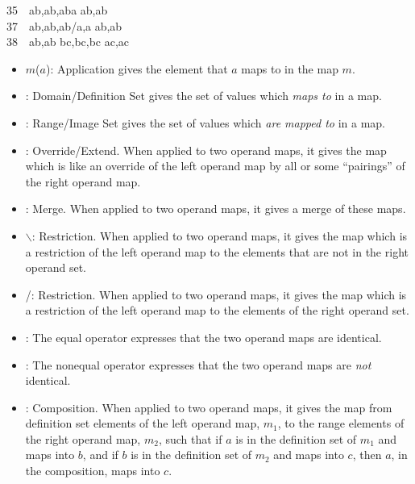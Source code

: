 {{\LBRACKET}35{\RBRACKET}\ \ {\LBRACKET}a{\MAPSTO}b,a{\PRIM}{\MAPSTO}b{\PRIM},a{\PRIM}{\PRIM}{\MAPSTO}b{\PRIM}{\PRIM}{\RBRACKET}{\SETMINUS}{\LBRACE}a{\RBRACE} {\EQ} {\LBRACKET}a{\PRIM}{\MAPSTO}b{\PRIM},a{\PRIM}{\PRIM}{\MAPSTO}b{\PRIM}{\PRIM}{\RBRACKET}\\
{\LBRACKET}37{\RBRACKET}\ \ {\LBRACKET}a{\MAPSTO}b,a{\PRIM}{\MAPSTO}b{\PRIM},a{\PRIM}{\PRIM}{\MAPSTO}b{\PRIM}{\PRIM}{\RBRACKET}/{\LBRACE}a{\PRIM},a{\PRIM}{\PRIM}{\RBRACE} {\EQ} {\LBRACKET}a{\PRIM}{\MAPSTO}b{\PRIM},a{\PRIM}{\PRIM}{\MAPSTO}b{\PRIM}{\PRIM}{\RBRACKET}\\
{\LBRACKET}38{\RBRACKET}\ \ {\LBRACKET}a{\MAPSTO}b,a{\PRIM}{\MAPSTO}b{\PRIM}{\RBRACKET} {\HASH} {\LBRACKET}b{\MAPSTO}c,b{\PRIM}{\MAPSTO}c{\PRIM},b{\PRIM}{\PRIM}{\MAPSTO}c{\PRIM}{\PRIM}{\RBRACKET} {\EQ} {\LBRACKET}a{\MAPSTO}c,a{\PRIM}{\MAPSTO}c{\PRIM}{\RBRACKET}
\ep
}


\begin{itemize}
\item{$m$($a$):} Application gives the element that $a$ maps to in
  the map $m$.
\item{:} Domain/Definition Set gives the set of values which
  \emph{maps to} in a map. 
\item{:} Range/Image Set gives the set of values which
  \emph{are mapped to} in a map.   
\item{\DAGGER:} Override/Extend. When applied to two operand maps, it
      gives the map which is like an 
      override of the left operand map by all or some ``pairings'' of
      the right operand map.
\item{\UNION:} Merge. When applied to two operand maps, it
  gives a merge of these maps. 
\hhhh
\item{$\backslash$:} Restriction. When applied to two operand maps, it
      gives the map which is a restriction of the left operand map to
      the  elements that are not in the right operand set. 
\item{/:} Restriction. When applied to two operand maps, it gives the
  map which is a restriction of the left operand map to the elements
  of the right operand set. 
\item{\EQ:} The equal operator expresses that the two operand maps are
  identical. 
\item{\NOTEQ:} The nonequal operator expresses that the two
  operand maps are \emph{not} identical. 
\item{\HASH:} Composition. When applied to two operand maps, it gives
  the map from definition set elements of the left operand map, $m_1$,
  to the range elements of the right operand map, $m_2$, such that if
  $a$ is in the definition set of $m_1$ and maps into $b$, and if $b$ is
  in the definition set of $m_2$ and maps into $c$, then $a$, in the
  composition, maps into $c$.  
\end{itemize} 

